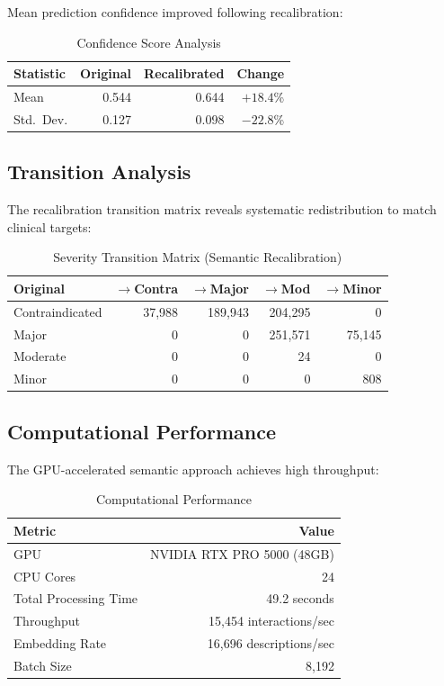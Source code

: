 \documentclass[11pt,a4paper]{article}
\begin{document}
Mean prediction confidence improved following recalibration:

\begin{table}[H]
\centering
\caption{Confidence Score Analysis}
\label{tab:confidence}
\begin{tabular}{@{}lrrr@{}}
\toprule
\textbf{Statistic} & \textbf{Original} & \textbf{Recalibrated} & \textbf{Change} \\
\midrule
Mean & 0.544 & 0.644 & $+18.4$\% \\
Std.\ Dev. & 0.127 & 0.098 & $-22.8$\% \\
\bottomrule
\end{tabular}
\end{table}

\subsection{Transition Analysis}

The recalibration transition matrix reveals systematic redistribution to match clinical targets:

\begin{table}[H]
\centering
\caption{Severity Transition Matrix (Semantic Recalibration)}
\label{tab:transition}
\begin{tabular}{@{}lrrrr@{}}
\toprule
\textbf{Original} & \textbf{$\to$Contra} & \textbf{$\to$Major} & \textbf{$\to$Mod} & \textbf{$\to$Minor} \\
\midrule
Contraindicated & 37,988 & 189,943 & 204,295 & 0 \\
Major & 0 & 0 & 251,571 & 75,145 \\
Moderate & 0 & 0 & 24 & 0 \\
Minor & 0 & 0 & 0 & 808 \\
\bottomrule
\end{tabular}
\end{table}

\subsection{Computational Performance}

The GPU-accelerated semantic approach achieves high throughput:

\begin{table}[H]
\centering
\caption{Computational Performance}
\label{tab:performance}
\begin{tabular}{@{}lr@{}}
\toprule
\textbf{Metric} & \textbf{Value} \\
\midrule
GPU & NVIDIA RTX PRO 5000 (48GB) \\
CPU Cores & 24 \\
Total Processing Time & 49.2 seconds \\
Throughput & 15,454 interactions/sec \\
Embedding Rate & 16,696 descriptions/sec \\
Batch Size & 8,192 \\
\bottomrule
\end{tabular}
\end{table}
\end{document}
